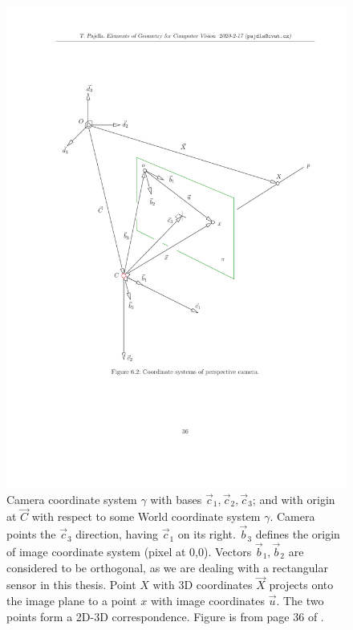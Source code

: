 \documentclass[twoside]{ctuthesis}
\theoremstyle{plain}
\theoremstyle{definition}
\theoremstyle{note}
\begin{document}
\begin{figure}[htb!]
	\centering
	\includegraphics[width=1.0\textwidth,viewport=2.93cm 7.54cm 19.49cm 25.3cm,clip]{GVG_page_cameraCS.pdf}
	\caption[Camera coordinate system]{Camera coordinate system $\gamma$ with bases $\vec c_1, \vec c_2, \vec c_3$; and with origin at $\vec C$ with respect to some World coordinate system $\gamma$. Camera points the $\vec c_3$ direction, having $\vec c_1$ on its right. $\vec b_3$ defines the origin of image coordinate system (pixel at 0,0). Vectors $\vec b_1, \vec b_2$ are considered to be orthogonal, as we are dealing with a rectangular sensor in this thesis. Point $X$ with 3D coordinates $\vec X$ projects onto the image plane to a point $x$ with image coordinates $\vec u$. The two points form a 2D-3D correspondence. Figure is from page 36 of \cite{GVG}.}
	\label{fig:cameraCoordinateSystem}
\end{figure}
\end{document}
